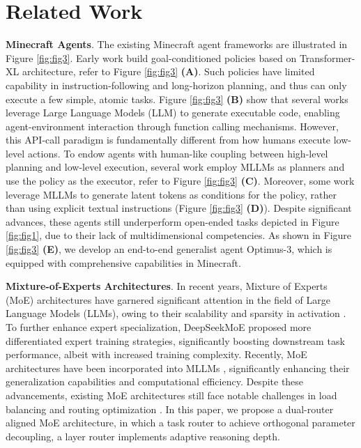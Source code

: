 \section{Related Work}

\noindent\textbf{Minecraft Agents}. The existing Minecraft agent frameworks are illustrated in Figure \ref{fig:fig3}. Early work \cite{vpt,fan2022minedojo,lifshitz2024steve,cai2023groot,deng2025open} build goal-conditioned policies based on Transformer-XL architecture, refer to Figure \ref{fig:fig3} \textbf{(A)}. Such policies have limited capability in instruction-following and long-horizon planning, and thus can only execute a few simple, atomic tasks. Figure \ref{fig:fig3} \textbf{(B)} show that several works \cite{wang2023voyager,liu2024rl,liu2024odyssey,li2024auto,li2024larm,zhou2024wall} leverage Large Language Models (LLM) to generate executable code, enabling agent-environment interaction through function calling mechanisms. However, this API-call paradigm is fundamentally different from how humans execute low-level actions. To endow agents with human-like coupling between high-level planning and low-level execution, several work \cite{qin2023mp5,wang2023describe,wang2023jarvis,li2024optimus,li2025optimus} employ MLLMs as planners and use the policy as the executor, refer to Figure \ref{fig:fig3} \textbf{(C)}. Moreover, some work \cite{wang2024omnijarvis,cai2025rocket1} leverage MLLMs to generate latent tokens as conditions for the policy, rather than using explicit textual instructions (Figure \ref{fig:fig3} \textbf{(D)}). Despite significant advances, these agents still underperform open-ended tasks depicted in Figure \ref{fig:fig1}, due to their lack of multidimensional competencies. As shown in Figure \ref{fig:fig3} \textbf{(E)}, we develop an end-to-end generalist agent Optimus-3, which is equipped with comprehensive capabilities in Minecraft.


\noindent\textbf{Mixture-of-Experts Architectures}. In recent years, Mixture of Experts (MoE) architectures \cite{mu2025comprehensive,moesurvey} have garnered significant attention in the field of Large Language Models (LLMs), owing to their scalability and sparsity in activation \cite{lepikhin2020gshard,fedus2022switch,du2022glam}. To further enhance expert specialization, DeepSeekMoE \cite{dai2401deepseekmoe} proposed more differentiated expert training strategies, significantly boosting downstream task performance, albeit with increased training complexity. Recently, MoE architectures have been incorporated into MLLMs \cite{shen2025mome,li2025uni,lin2024moma,wu2024omni,huang2025modes}, significantly enhancing their generalization capabilities and computational efficiency. Despite these advancements, existing MoE architectures still face notable challenges in load balancing and routing optimization \cite{shen2025mome}. In this paper, we propose a dual-router aligned MoE architecture, in which a task router to achieve orthogonal parameter decoupling, a layer router implements adaptive reasoning depth.

